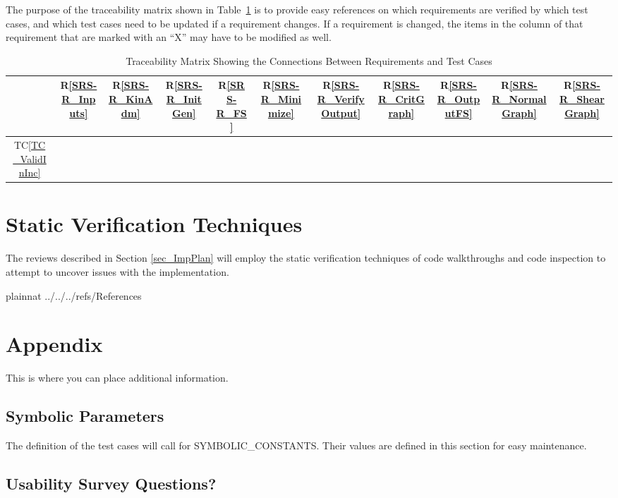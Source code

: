 \documentclass[12pt, titlepage]{article}
\newcommand{\rref}[1]{R\ref{#1}}
\newcommand{\tcref}[1]{TC\ref{#1}}
\begin{document}
\noindent The purpose of the traceability matrix shown in 
Table~\ref{Table:T_trace} is to provide easy 
references on which requirements are verified by which test cases, and which 
test cases need to be updated if a requirement changes.  If a requirement is 
changed, the items in the column of that requirement that are marked
with an ``X'' may have to be modified as well. 

\begin{table}[!h]
	\centering
	\begin{tabular}{|c|c|c|c|c|c|c|c|c|c|c|}
		\hline
		& \rref{SRS-R_Inputs}& \rref{SRS-R_KinAdm}& \rref{SRS-R_InitGen}& 
		\rref{SRS-R_FS}& \rref{SRS-R_Minimize} & \rref{SRS-R_VerifyOutput}& 
		\rref{SRS-R_CritGraph}& \rref{SRS-R_OutputFS}& 
		\rref{SRS-R_NormalGraph}& \rref{SRS-R_ShearGraph} \\
		\hline
		\tcref{TC_ValidInInc}       & & & & & & & & & & \\ \hline
		\hline
	\end{tabular}
	\caption{Traceability Matrix Showing the Connections Between Requirements 
	and Test Cases}
	\label{Table:T_trace}
\end{table}

\section{Static Verification Techniques} \label{sec_Static}

The reviews described in Section \ref{sec_ImpPlan} will employ the static 
verification techniques of code walkthroughs and code inspection to attempt to 
uncover issues with the implementation.
				
\newpage

 {plainnat}
 {../../../refs/References}

\newpage

\section{Appendix}

This is where you can place additional information.

\subsection{Symbolic Parameters}

The definition of the test cases will call for SYMBOLIC\_CONSTANTS.
Their values are defined in this section for easy maintenance.

\subsection{Usability Survey Questions?}

\end{document}

